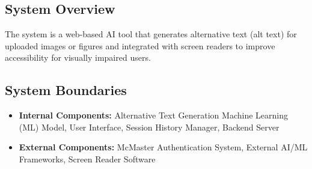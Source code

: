 \documentclass{article}
\begin{document}

\subsection{System Overview}
The system is a web-based AI tool that generates alternative text
(alt text) for uploaded images or figures
and integrated with screen readers to improve accessibility for
visually impaired users.
\subsection{System Boundaries}
\begin{itemize}
    \item \textbf{Internal Components:} Alternative Text Generation Machine Learning (ML) Model, User Interface, Session History Manager, Backend Server
    \item \textbf{External Components:} McMaster Authentication System, External AI/ML Frameworks, Screen Reader Software
\end{itemize}
\end{document}
